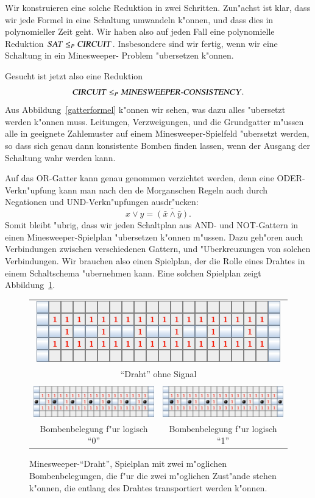 Wir konstruieren eine solche Reduktion in zwei Schritten. Zun"achst ist
klar, dass wir jede Formel in eine Schaltung umwandeln k"onnen, und
dass dies in polynomieller Zeit geht. Wir haben also auf jeden
Fall eine polynomielle Reduktion $\text{\textsl{SAT}}\le_P\text{\textsl{CIRCUIT}}$.
Insbesondere sind wir fertig, wenn wir eine Schaltung in ein Minesweeper-%
Problem "ubersetzen k"onnen.

Gesucht ist jetzt also eine Reduktion 
\[
\text{\textsl{CIRCUIT}} \le_P \text{\textsl{MINESWEEPER-CONSISTENCY}}.
\]
Aus Abbildung~\ref{gatterformel} k"onnen wir sehen, was dazu alles
"ubersetzt werden k"onnen muss. Leitungen, Verzweigungen, und die Grundgatter
m"ussen alle in geeignete Zahlemuster auf einem Minesweeper-Spielfeld
"ubersetzt werden, so dass sich genau dann konsistente Bomben
finden lassen, wenn der Ausgang der Schaltung wahr werden kann.

Auf das OR-Gatter kann genau genommen verzichtet werden, denn eine
ODER-Verkn"upfung kann man nach den de Morganschen Regeln auch durch
Negationen und UND-Verkn"upfungen ausdr"ucken:
\[
x\vee y = \overline{(\bar x \wedge \bar y)}.
\]
Somit bleibt "ubrig, dass wir jeden Schaltplan aus AND- und NOT-Gattern
in einen Minesweeper-Spielplan "ubersetzen k"onnen m"ussen. Dazu geh"oren
auch Verbindungen zwischen verschiedenen Gattern, und "Uberkreuzungen von
solchen Verbindungen. Wir brauchen also einen Spielplan, der die Rolle
eines Drahtes in einem Schaltschema "ubernehmen kann. Eine solchen Spielplan
zeigt Abbildung~\ref{minesweeper-wire}.

\begin{figure}
\begin{center}
\begin{tabular}{cc}
\multicolumn{2}{c}{\includegraphics[width=0.45\hsize]{graphics/wire}}\\
\multicolumn{2}{c}{``Draht'' ohne Signal}\\
&\\
\includegraphics[width=0.45\hsize]{graphics/wire-0}&
\includegraphics[width=0.45\hsize]{graphics/wire-1}\\
Bombenbelegung f"ur logisch ``0''&
Bombenbelegung f"ur logisch ``1''
\end{tabular}
\end{center}
\caption{Minesweeper-``Draht'', Spielplan mit zwei m"oglichen Bombenbelegungen,
die f"ur die zwei m"oglichen Zust"ande stehen k"onnen, die entlang des
Drahtes transportiert werden k"onnen.\label{minesweeper-wire}}
\end{figure}%

